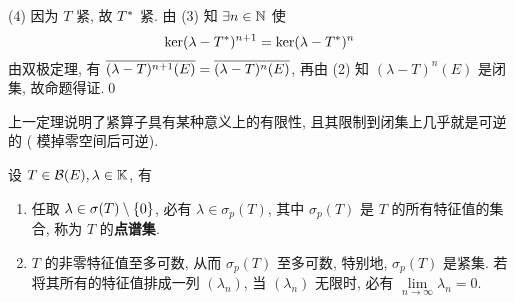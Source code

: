 \begin{Proof}
		(4) 因为 $ T $ 紧, 故 $ \Star{T} $ 紧. 由 (3) 知 $ \exists n\in\N $ 使
		\[
			\ker(\lambda-\Star{T})^{n+1}=\ker(\lambda-\Star{T})^{n}
		\]
		由双极定理, 有 $ \baro{(\lambda-T)^{n+1}(E)}=\baro{(\lambda-T)^{n}(E)} $, 再由 (2) 知 $ (\lambda-T)^{n}(E) $ 是闭集, 故命题得证.\qed
	\end{Proof}
	
	\begin{Remark}
		上一定理说明了紧算子具有某种意义上的有限性, 且其限制到闭集上几乎就是可逆的 ( 模掉零空间后可逆).
	\end{Remark}

	\begin{Theorem}
		设 $ T\in\CB(E), \lambda\in\K $, 有
		\begin{enumerate}[(1)]
			\item 任取 $ \lambda\in\sigma(T)\sm \{ 0 \} $, 必有 $ \lambda\in\sigma_{p}(T) $, 其中 $ \sigma_{p}(T) $ 是 $ T $ 的所有特征值的集合, 称为 $ T $ 的\textbf{点谱集}.
			\item $ T $ 的非零特征值至多可数, 从而 $ \sigma_{p}(T) $ 至多可数, 特别地,  $ \sigma_{p}(T) $ 是紧集. 若将其所有的特征值排成一列 $ (\lambda_{n}) $, 当 $ (\lambda_{n}) $ 无限时, 必有 $ \lim\limits_{n\to\infty}\lambda_{n}=0 $.
		\end{enumerate}
	\end{Theorem}
